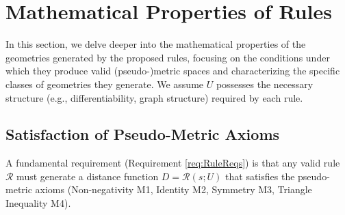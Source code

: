 \documentclass[twoside,twocolumn]{article}
\begin{document}

\setcounter{equation}{0}
\section{Mathematical Properties of Rules}

In this section, we delve deeper into the mathematical properties of the geometries generated by the proposed rules, focusing on the conditions under which they produce valid (pseudo-)metric spaces and characterizing the specific classes of geometries they generate. We assume \( U \) possesses the necessary structure (e.g., differentiability, graph structure) required by each rule.

\newtheorem{proposition}{Proposition}[section] %

\subsection{Satisfaction of Pseudo-Metric Axioms}

A fundamental requirement (Requirement \ref{req:RuleReqs}) is that any valid rule \( \mathcal{R} \) must generate a distance function \( D = \mathcal{R}(s; U) \) that satisfies the pseudo-metric axioms (Non-negativity M1, Identity M2, Symmetry M3, Triangle Inequality M4).
\end{document}
